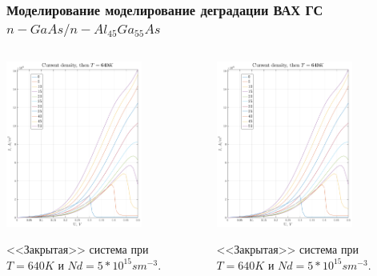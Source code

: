 \documentclass[10pt,pdf,hyperref={unicode},aspectratio={169}]{beamer}
\begin{document}
\begin{frame}
	\frametitle{Моделирование моделирование деградации ВАХ ГС $n\!-\!GaAs/n\!-\!Al_{45}Ga_{55}As$}
	\begin{columns}
		\begin{center}
			\includegraphics[width=0.7\textwidth]{assets/J1DCAlGaAsNd}

			<<Закрытая>> система при $T = 640K$ и $Nd = 5*10^{15} sm^{-3}$.
		\end{center}
		\begin{center}
			\includegraphics[width=0.7\textwidth]{assets/J1DCAlGaAsNd}

			<<Закрытая>> система при $T = 640K$ и $Nd = 5*10^{15} sm^{-3}$.
		\end{center}
	\end{columns}
\end{frame}
\end{document}
